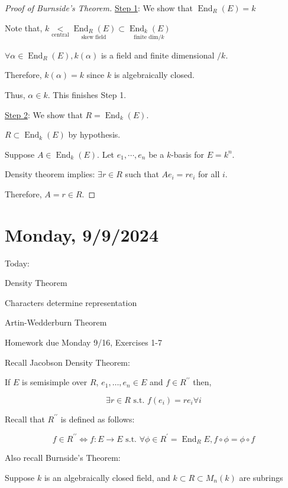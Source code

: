 \documentclass{article}
\theoremstyle{definition}
\newcommand{\End}{\operatorname{End}}
\begin{document}
\begin{proof}
    [Proof of Burnside's Theorem]

    \underline{Step 1}: We show that \(\End_R(E) = k\)

    Note that, \(k \underset{\text{central}}{<}  \underset{\text{skew field}}{\End_R(E)} \subset \underset{\text{finite dim} / k}{\End_k(E)} \) 

    \(\forall \alpha \in \End_R(E), k(\alpha)\) is a field and finite dimensional \(/ k\).

    Therefore, \(k(\alpha) = k\) since \(k\) is algebraically closed.

    Thus, \(\alpha \in k\). This finishes Step 1.

    \underline{Step 2}: We show that \(R = \End_k(E)\).

    \(R \subset \End_k(E)\) by hypothesis.

    Suppose \(A\in \End_k(E)\). Let \(e_1, \cdots , e_n\) be a \(k\)-basis for \(E = k^n\).

    Density theorem implies: \(\exists r\in R\) such that \(A e_i = re_i\) for all \(i\).

    Therefore, \(A = r \in R\).

\end{proof}

\section*{Monday, 9/9/2024}

Today:

Density Theorem

Characters determine representation

Artin-Wedderburn Theorem

Homework due Monday 9/16, Exercises 1-7

Recall Jacobson Density Theorem:

If \(E\) is semisimple over \(R\), \(e_1, \dots, e_n \in E\) and \(f\in R^{\prime\prime}\) then,

\[
    \exists r\in R \text{ s.t. } f(e_i) = re_i \forall i
\]

Recall that \(R^{\prime\prime} \) is defined as follows:

\[
    f\in R^{\prime\prime} \iff f:E \to E \text{ s.t. } \forall \phi\in R^{\prime} =\End_{R} E, f \circ \phi = \phi \circ f
\]

Also recall Burnside's Theorem:

Suppose \(k\) is an algebraically closed field, and \(k \subset R \subset M_n(k)\) are subrings
\end{document}
